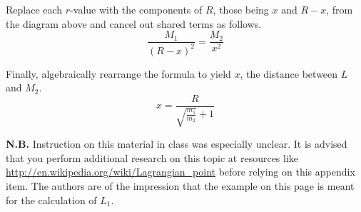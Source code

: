 Replace each $r$-value with the components of $R$, those being $x$ and $R-x$, from the diagram above and cancel out shared terms as follows.
\begin{equation*}
	\displaystyle\frac{M_1}{\left(R-x\right)^2} = \frac{M_2}{x^2}
\end{equation*}

Finally, algebraically rearrange the formula to yield $x$, the distance between $L$ and $M_2$.
\begin{equation*}
	x = \frac{R}{\sqrt{\frac{m_1}{m_2}} + 1} 
\end{equation*}

\textbf{N.B.} Instruction on this material in class was especially unclear. It is advised that you perform additional research on this topic at resources like \url{http://en.wikipedia.org/wiki/Lagrangian_point} before relying on this appendix item. The authors are of the impression that the example on this page is meant for the calculation of $L_1$.


